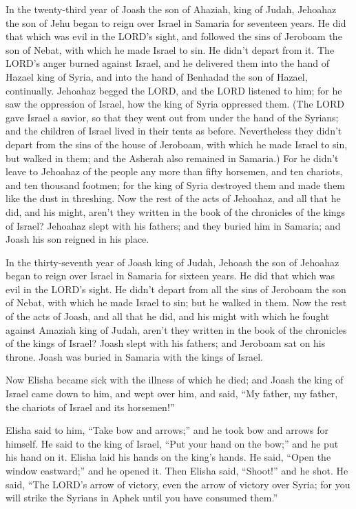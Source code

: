 \mychapter{} \myverse*{}In the twenty-third year of Joash the son of Ahaziah, king of
Judah, Jehoahaz the son of Jehu began to reign over Israel in Samaria for seventeen years.
\myverse{}He did that which was evil in the LORD’s sight, and followed the sins of Jeroboam
the son of Nebat, with which he made Israel to sin. He didn’t depart from it.
\myverse{}The LORD’s anger burned against Israel, and he delivered them into the hand
of Hazael king of Syria, and into the hand of Benhadad the son of Hazael, continually.
\myverse{}Jehoahaz begged the LORD, and the LORD listened to him; for he saw the oppression
of Israel, how the king of Syria oppressed them.
\myverse{}(The LORD gave Israel a savior, so that they went out from under the hand of
the Syrians; and the children of Israel lived in their tents as before.
\myverse{}Nevertheless they didn’t depart from the sins of the house of Jeroboam, with
which he made Israel to sin, but walked in them; and the Asherah also remained in Samaria.)
\myverse{}For he didn’t leave to Jehoahaz of the people any more than fifty horsemen,
and ten chariots, and ten thousand footmen; for the king of Syria destroyed them and made them like the
dust in threshing.
\myverse{}Now the rest of the acts of Jehoahaz, and all that he did, and his might, aren’t
they written in the book of the chronicles of the kings of Israel?
\myverse{}Jehoahaz slept with his fathers; and they buried him in Samaria; and Joash
his son reigned in his place.

\myverse{}In the thirty-seventh year of Joash king of Judah, Jehoash the
son of Jehoahaz began to reign over Israel in Samaria for sixteen years.
\myverse{}He did that which was evil in the LORD’s sight. He didn’t depart from all
the sins of Jeroboam the son of Nebat, with which he made Israel to sin; but he walked in them.
\myverse{}Now the rest of the acts of Joash, and all that he did, and his might with
which he fought against Amaziah king of Judah, aren’t they written in the book of the chronicles of the
kings of Israel?
\myverse{}Joash slept with his fathers; and Jeroboam sat on his throne. Joash was buried
in Samaria with the kings of Israel.

\myverse{}Now Elisha became sick with the illness of which he died; and
Joash the king of Israel came down to him, and wept over him, and said, “My father, my father, the chariots
of Israel and its horsemen!”

\myverse{}Elisha said to him, “Take bow and arrows;” and he took bow and
arrows for himself.
\myverse{}He said to the king of Israel, “Put your hand on the bow;” and he put his
hand on it. Elisha laid his hands on the king’s hands.
\myverse{}He said, “Open the window eastward;” and he opened it. Then Elisha said,
“Shoot!” and he shot. He said, “The LORD’s arrow of victory, even the arrow of victory over Syria; for
you will strike the Syrians in Aphek until you have consumed them.”

